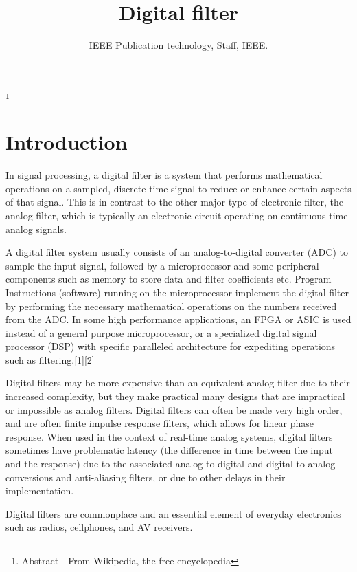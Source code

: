 \documentclass[12pt,a4paper,twocolumn]{scrartcl}
\begin{document}
\author{IEEE Publication technology, Staff, IEEE.}

\title{Digital filter}






\maketitle
\thanks{Abstract—From Wikipedia, the free encyclopedia}
\section*{\centering Introduction}
In signal processing, a digital filter is a system that performs mathematical operations on a sampled, discrete-time signal to reduce or enhance certain aspects of that signal. This is in contrast to the other major type of electronic filter, the analog filter, which is typically an electronic circuit operating on continuous-time analog signals.

A digital filter system usually consists of an analog-to-digital converter (ADC) to sample the input signal, followed by a microprocessor and some peripheral components such as memory to store data and filter coefficients etc. Program Instructions (software) running on the microprocessor implement the digital filter by performing the necessary mathematical operations on the numbers received from the ADC. In some high performance applications, an FPGA or ASIC is used instead of a general purpose microprocessor, or a specialized digital signal processor (DSP) with specific paralleled architecture for expediting operations such as filtering.[1][2]

Digital filters may be more expensive than an equivalent analog filter due to their increased complexity, but they make practical many designs that are impractical or impossible as analog filters. Digital filters can often be made very high order, and are often finite impulse response filters, which allows for linear phase response. When used in the context of real-time analog systems, digital filters sometimes have problematic latency (the difference in time between the input and the response) due to the associated analog-to-digital and digital-to-analog conversions and anti-aliasing filters, or due to other delays in their implementation.

Digital filters are commonplace and an essential element of everyday electronics such as radios, cellphones, and AV receivers.
\end{document}
